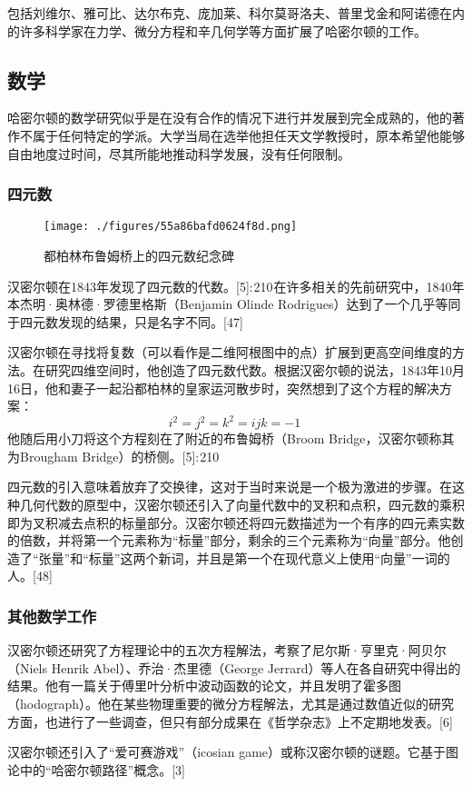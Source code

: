 包括刘维尔、雅可比、达尔布克、庞加莱、科尔莫哥洛夫、普里戈金和阿诺德在内的许多科学家在力学、微分方程和辛几何学等方面扩展了哈密尔顿的工作。
\subsection{数学} 
哈密尔顿的数学研究似乎是在没有合作的情况下进行并发展到完全成熟的，他的著作不属于任何特定的学派。大学当局在选举他担任天文学教授时，原本希望他能够自由地度过时间，尽其所能地推动科学发展，没有任何限制。
\subsubsection{四元数}
\begin{figure}[ht]
\centering
\texttt{[image: ./figures/55a86bafd0624f8d.png]}
\caption{都柏林布鲁姆桥上的四元数纪念碑} \label{fig_WLHMD_2}
\end{figure}
汉密尔顿在1843年发现了四元数的代数。[5]: 210 在许多相关的先前研究中，1840年本杰明·奥林德·罗德里格斯（Benjamin Olinde Rodrigues）达到了一个几乎等同于四元数发现的结果，只是名字不同。[47]

汉密尔顿在寻找将复数（可以看作是二维阿根图中的点）扩展到更高空间维度的方法。在研究四维空间时，他创造了四元数代数。根据汉密尔顿的说法，1843年10月16日，他和妻子一起沿都柏林的皇家运河散步时，突然想到了这个方程的解决方案：
\[i^2 = j^2 = k^2 = ijk = -1 ~\]
他随后用小刀将这个方程刻在了附近的布鲁姆桥（Broom Bridge，汉密尔顿称其为Brougham Bridge）的桥侧。[5]: 210 

四元数的引入意味着放弃了交换律，这对于当时来说是一个极为激进的步骤。在这种几何代数的原型中，汉密尔顿还引入了向量代数中的叉积和点积，四元数的乘积即为叉积减去点积的标量部分。汉密尔顿还将四元数描述为一个有序的四元素实数的倍数，并将第一个元素称为“标量”部分，剩余的三个元素称为“向量”部分。他创造了“张量”和“标量”这两个新词，并且是第一个在现代意义上使用“向量”一词的人。[48]
\subsubsection{其他数学工作} 
汉密尔顿还研究了方程理论中的五次方程解法，考察了尼尔斯·亨里克·阿贝尔（Niels Henrik Abel）、乔治·杰里德（George Jerrard）等人在各自研究中得出的结果。他有一篇关于傅里叶分析中波动函数的论文，并且发明了霍多图（hodograph）。他在某些物理重要的微分方程解法，尤其是通过数值近似的研究方面，也进行了一些调查，但只有部分成果在《哲学杂志》上不定期地发表。[6]

汉密尔顿还引入了“爱可赛游戏”（icosian game）或称汉密尔顿的谜题。它基于图论中的“哈密尔顿路径”概念。[3]
